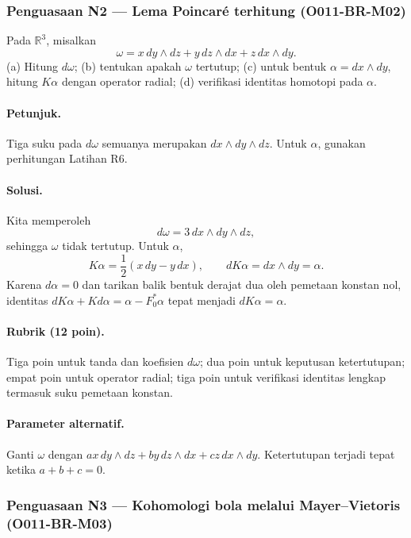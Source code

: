 \subsubsection*{Penguasaan N2 — Lema Poincar\'e terhitung (O011-BR-M02)}
\label{o011-br-m02}

Pada $\mathbb R^3$, misalkan
\[
 \omega=x\,dy\wedge dz+y\,dz\wedge dx+z\,dx\wedge dy.
\]
(a) Hitung $d\omega$; (b) tentukan apakah $\omega$ tertutup; (c) untuk bentuk
$\alpha=dx\wedge dy$, hitung $K\alpha$ dengan operator radial; (d) verifikasi
identitas homotopi pada $\alpha$.

\paragraph{Petunjuk.}
Tiga suku pada $d\omega$ semuanya merupakan $dx\wedge dy\wedge dz$. Untuk
$\alpha$, gunakan perhitungan Latihan R6.

\paragraph{Solusi.}
Kita memperoleh
\[
 d\omega=3\,dx\wedge dy\wedge dz,
\]
sehingga $\omega$ tidak tertutup. Untuk $\alpha$,
\[
 K\alpha=\frac12(x\,dy-y\,dx),
 \qquad dK\alpha=dx\wedge dy=\alpha.
\]
Karena $d\alpha=0$ dan tarikan balik bentuk derajat dua oleh pemetaan konstan
nol, identitas $dK\alpha+Kd\alpha=\alpha-F_0^*\alpha$ tepat menjadi
$dK\alpha=\alpha$.

\paragraph{Rubrik (12 poin).}
Tiga poin untuk tanda dan koefisien $d\omega$; dua poin untuk keputusan
ketertutupan; empat poin untuk operator radial; tiga poin untuk verifikasi
identitas lengkap termasuk suku pemetaan konstan.

\paragraph{Parameter alternatif.}
Ganti $\omega$ dengan
$a x\,dy\wedge dz+b y\,dz\wedge dx+c z\,dx\wedge dy$.
Ketertutupan terjadi tepat ketika $a+b+c=0$.

\subsubsection*{Penguasaan N3 — Kohomologi bola melalui Mayer--Vietoris (O011-BR-M03)}
\label{o011-br-m03}

